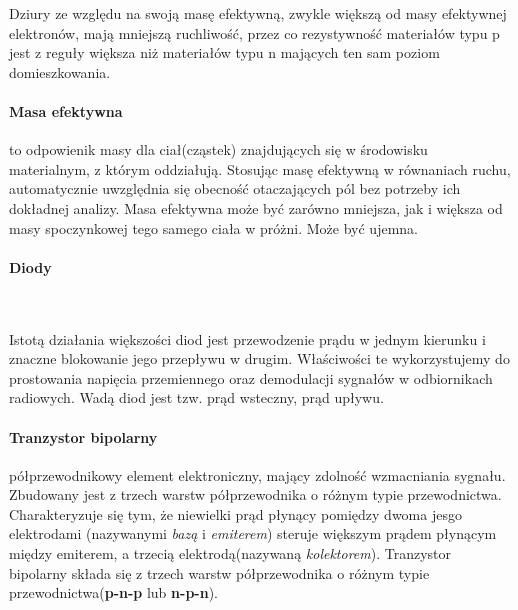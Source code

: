 \documentclass{article}
\begin{document}
            Dziury ze względu na swoją masę efektywną, zwykle większą
            od masy efektywnej elektronów, mają mniejszą ruchliwość,
            przez co rezystywność materiałów typu p jest z reguły większa
            niż materiałów typu n mających ten sam poziom domieszkowania.

            \paragraph{Masa efektywna}
            to odpowienik masy dla ciał(cząstek) znajdujących się w środowisku
            materialnym, z którym oddziałują. Stosując masę efektywną w równaniach
            ruchu, automatycznie uwzględnia się obecność otaczających pól
            bez potrzeby ich dokładnej analizy. Masa efektywna może być zarówno
            mniejsza, jak i większa od masy spoczynkowej tego samego ciała
            w próżni. Może być ujemna.

            \paragraph{Diody}

            \
            
            Istotą działania większości diod jest przewodzenie prądu
            w jednym kierunku i znaczne blokowanie jego przepływu
            w drugim. Właściwości te wykorzystujemy do prostowania
            napięcia przemiennego oraz demodulacji sygnałów w
            odbiornikach radiowych. Wadą diod jest tzw. prąd wsteczny,
            prąd upływu.

            \paragraph{Tranzystor bipolarny}
            półprzewodnikowy element elektroniczny, mający zdolność wzmacniania sygnału.
            Zbudowany jest z trzech warstw półprzewodnika o różnym typie przewodnictwa.
            Charakteryzuje się tym, że niewielki prąd płynący pomiędzy dwoma jesgo elektrodami
            (nazywanymi \textit{bazą} i \textit{emiterem}) steruje większym prądem
            płynącym między emiterem, a trzecią elektrodą(nazywaną \textit{kolektorem}).
            Tranzystor bipolarny składa się z trzech warstw półprzewodnika
            o różnym typie przewodnictwa(\textbf{p-n-p} lub \textbf{n-p-n}).

            \
            
\end{document}

